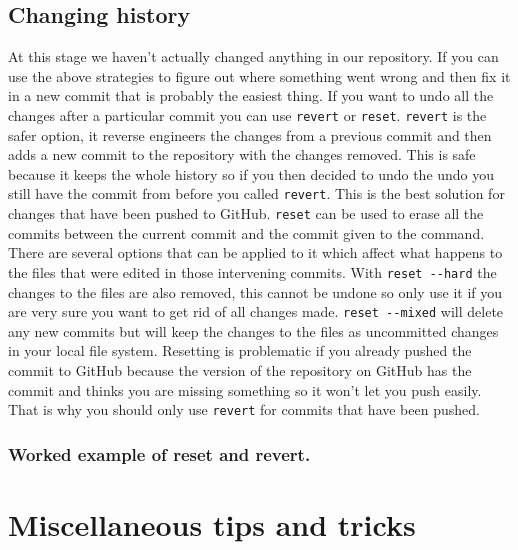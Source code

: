 \documentclass[
  letterpaper,
  DIV=11,
  numbers=noendperiod]{scrreprt}
\begin{document}
\hypertarget{changing-history}{%
\section{Changing history}\label{changing-history}}

At this stage we haven't actually changed anything in our repository. If
you can use the above strategies to figure out where something went
wrong and then fix it in a new commit that is probably the easiest
thing. If you want to undo all the changes after a particular commit you
can use \texttt{revert} or \texttt{reset}. \texttt{revert} is the safer
option, it reverse engineers the changes from a previous commit and then
adds a new commit to the repository with the changes removed. This is
safe because it keeps the whole history so if you then decided to undo
the undo you still have the commit from before you called
\texttt{revert}. This is the best solution for changes that have been
pushed to GitHub. \texttt{reset} can be used to erase all the commits
between the current commit and the commit given to the command. There
are several options that can be applied to it which affect what happens
to the files that were edited in those intervening commits. With
\texttt{reset\ -\/-hard} the changes to the files are also removed, this
cannot be undone so only use it if you are very sure you want to get rid
of all changes made. \texttt{reset\ -\/-mixed} will delete any new
commits but will keep the changes to the files as uncommitted changes in
your local file system. Resetting is problematic if you already pushed
the commit to GitHub because the version of the repository on GitHub has
the commit and thinks you are missing something so it won't let you push
easily. That is why you should only use \texttt{revert} for commits that
have been pushed.

\hypertarget{worked-example-of-reset-and-revert.}{%
\subsection{Worked example of reset and
revert.}\label{worked-example-of-reset-and-revert.}}


\hypertarget{miscellaneous-tips-and-tricks}{%
\chapter{Miscellaneous tips and
tricks}\label{miscellaneous-tips-and-tricks}}
\end{document}
